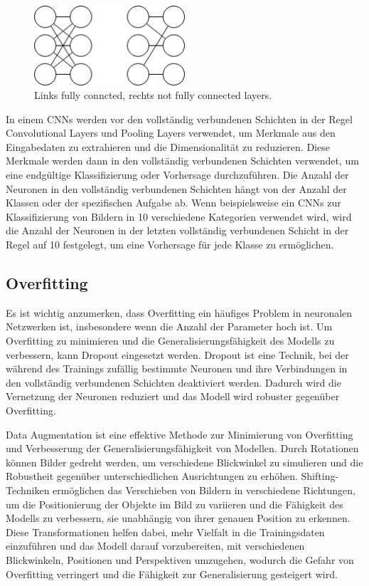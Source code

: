         \begin{figure}[h]
            \centering
            \includegraphics[width=0.5\textwidth]{img/fully_not_connected_layers.png}
            \caption{Links fully conncted, rechts not fully connected layers.}
            \label{fig:fc_layer}
        \end{figure}

    In einem \acp{CNN} werden vor den vollständig verbundenen Schichten in der Regel Convolutional Layers und Pooling Layers verwendet, um Merkmale aus den Eingabedaten zu extrahieren und die Dimensionalität zu reduzieren.
    Diese Merkmale werden dann in den vollständig verbundenen Schichten verwendet, um eine endgültige Klassifizierung oder Vorhersage durchzuführen.    
    Die Anzahl der Neuronen in den vollständig verbundenen Schichten hängt von der Anzahl der Klassen oder der spezifischen Aufgabe ab.
    Wenn beispielsweise ein \acp{CNN} zur Klassifizierung von Bildern in 10 verschiedene Kategorien verwendet wird, wird die Anzahl der Neuronen in der letzten vollständig verbundenen Schicht in der Regel auf 10 festgelegt, um eine Vorhersage für jede Klasse zu ermöglichen.   

\subsection{Overfitting}
        
    Es ist wichtig anzumerken, dass Overfitting ein häufiges Problem in neuronalen Netzwerken ist, insbesondere wenn die Anzahl der Parameter hoch ist.
    Um Overfitting zu minimieren und die Generalisierungsfähigkeit des Modells zu verbessern, kann Dropout eingesetzt werden.
    Dropout ist eine Technik, bei der während des Trainings zufällig bestimmte Neuronen und ihre Verbindungen in den vollständig verbundenen Schichten deaktiviert werden.
    Dadurch wird die Vernetzung der Neuronen reduziert und das Modell wird robuster gegenüber Overfitting.

    Data Augmentation ist eine effektive Methode zur Minimierung von Overfitting und Verbesserung der Generalisierungsfähigkeit von Modellen.
    Durch Rotationen können Bilder gedreht werden, um verschiedene Blickwinkel zu simulieren und die Robustheit gegenüber unterschiedlichen Ausrichtungen zu erhöhen.
    Shifting-Techniken ermöglichen das Verschieben von Bildern in verschiedene Richtungen, um die Positionierung der Objekte im Bild zu variieren und die Fähigkeit des Modells zu verbessern, sie unabhängig von ihrer genauen Position zu erkennen.
    Diese Transformationen helfen dabei, mehr Vielfalt in die Trainingsdaten einzuführen und das Modell darauf vorzubereiten, mit verschiedenen Blickwinkeln, Positionen und Perspektiven umzugehen, wodurch die Gefahr von Overfitting verringert und die Fähigkeit zur Generalisierung gesteigert wird.

